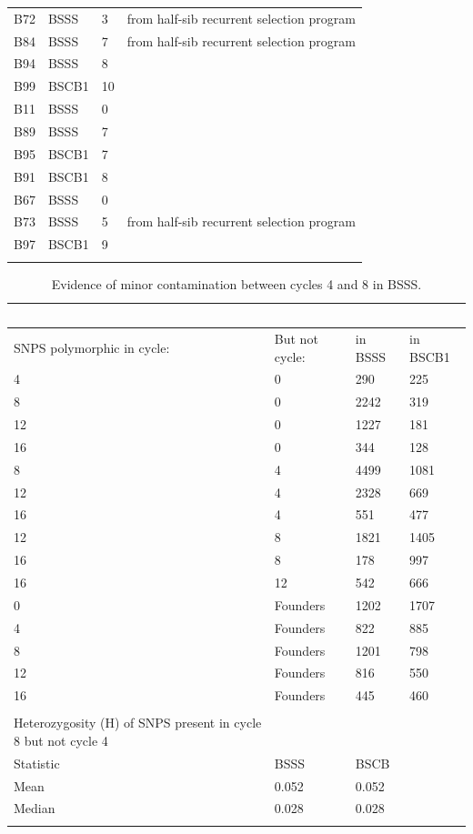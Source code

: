 \begin{table}
\begin{tabular}{ | l | l | l | l | }
	B72 & BSSS & 3 & from half-sib recurrent selection program \\ 
	B84 & BSSS & 7 & from half-sib recurrent selection program \\ 
	B94 & BSSS & 8 &  \\ 
	B99 & BSCB1 & 10 &  \\ 
	B11 & BSSS & 0 &  \\ 
	B89 & BSSS & 7 &  \\ 
	B95 & BSCB1 & 7 &  \\ 
	B91 & BSCB1 & 8 &  \\ 
	B67 & BSSS & 0 &  \\ 
	B73 & BSSS & 5 & from half-sib recurrent selection program \\ 
	B97 & BSCB1 & 9 &  \\ 
	    \label{tab:s1}  %
\end{tabular}
\end{table}
\newpage

\begin{table}
\caption{Evidence of minor contamination between cycles 4 and 8 in BSSS.}
\begin{tabular}{ | l | l | l | l | }
\hline
	\  & \  & \  & \  \\ \hline
	SNPS polymorphic in cycle: & But not cycle: & in BSSS & in BSCB1 \\ \hline
	4 & 0 & 290 & 225 \\ \hline
	8 & 0 & 2242 & 319 \\ \hline
	12 & 0 & 1227 & 181 \\ \hline
	16 & 0 & 344 & 128 \\ \hline
	8 & 4 & 4499 & 1081 \\ \hline
	12 & 4 & 2328 & 669 \\ \hline
	16 & 4 & 551 & 477 \\ \hline
	12 & 8 & 1821 & 1405 \\ \hline
	16 & 8 & 178 & 997 \\ \hline
	16 & 12 & 542 & 666 \\ \hline
	0 & Founders & 1202 & 1707 \\ \hline
	4 & Founders & 822 & 885 \\ \hline
	8 & Founders & 1201 & 798 \\ \hline
	12 & Founders & 816 & 550 \\ \hline
	16 & Founders & 445 & 460 \\ \hline
	 &  &  &  \\ \hline
	Heterozygosity (H) of SNPS present in cycle 8 but not cycle 4 &  &  &  \\ \hline
	Statistic & BSSS & BSCB &  \\ \hline
	Mean & 0.052 & 0.052 &  \\ \hline
	Median & 0.028 & 0.028 &  \\ \hline
	    \label{tab:s2}  %
\end{tabular}
\end{table}
\newpage



